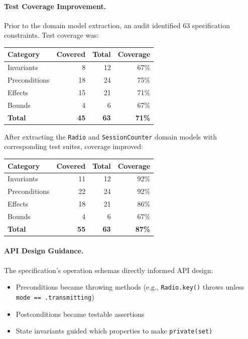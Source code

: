 \documentclass[a4paper,10pt,fleqn]{article}
\begin{document}
\paragraph{Test Coverage Improvement.}
Prior to the domain model extraction, an audit identified 63 specification
constraints. Test coverage was:

\begin{center}
\begin{tabular}{lrrr}
\textbf{Category} & \textbf{Covered} & \textbf{Total} & \textbf{Coverage} \\
\hline
Invariants & 8 & 12 & 67\% \\
Preconditions & 18 & 24 & 75\% \\
Effects & 15 & 21 & 71\% \\
Bounds & 4 & 6 & 67\% \\
\textbf{Total} & \textbf{45} & \textbf{63} & \textbf{71\%} \\
\end{tabular}
\end{center}

After extracting the \texttt{Radio} and \texttt{SessionCounter} domain models
with corresponding test suites, coverage improved:

\begin{center}
\begin{tabular}{lrrr}
\textbf{Category} & \textbf{Covered} & \textbf{Total} & \textbf{Coverage} \\
\hline
Invariants & 11 & 12 & 92\% \\
Preconditions & 22 & 24 & 92\% \\
Effects & 18 & 21 & 86\% \\
Bounds & 4 & 6 & 67\% \\
\textbf{Total} & \textbf{55} & \textbf{63} & \textbf{87\%} \\
\end{tabular}
\end{center}

\paragraph{API Design Guidance.}
The specification's operation schemas directly informed API design:

\begin{itemize}
\item Preconditions became throwing methods (e.g., \texttt{Radio.key()} throws
      unless \texttt{mode == .transmitting})
\item Postconditions became testable assertions
\item State invariants guided which properties to make \texttt{private(set)}
\end{itemize}
\end{document}
